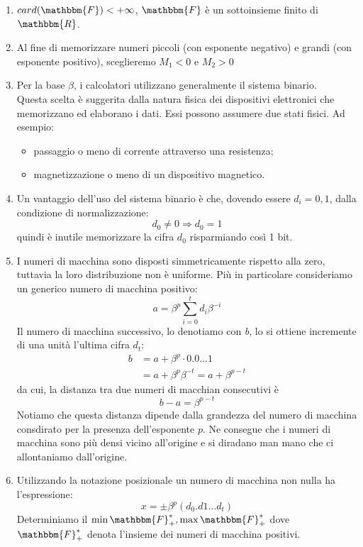 \documentclass[12pt]{report}
\begin{document}
	\begin{enumerate}
		\item $card(\mathbbm{F}) < +\infty$, $\mathbbm{F}$ è un sottoinsieme finito di $\mathbbm{R}$.
		\item Al fine di memorizzare numeri piccoli (con esponente negativo) e grandi (con esponente positivo), sceglieremo $M_1 < 0$ e $M_2 > 0$
		\item Per la base $\beta$, i calcolatori utilizzano generalmente il sistema binario. \\
		Questa scelta è suggerita dalla natura fisica dei dispositivi elettronici che memorizzano ed elaborano i dati. Essi possono assumere due stati fisici. Ad esempio:
		\begin{itemize}
			\item passaggio o meno di corrente attraverso una resistenza;
			\item magnetizzazione o meno di un dispositivo magnetico.
		\end{itemize}
		\item Un vantaggio dell'uso del sistema binario è che, dovendo essere $d_i = 0, 1$, dalla condizione di normalizzazione:
		\[
		d_0 \neq 0 \Rightarrow d_0 = 1
		\]
		quindi è inutile memorizzare la cifra $d_0$ risparmiando così 1 bit.
		\item I numeri di macchina sono disposti simmetricamente rispetto alla zero, tuttavia la loro distribuzione non è uniforme. Più in particolare consideriamo un generico numero di macchina positivo:
		\[
		a = \beta^p\sum_{i=0}^{t}d_i\beta^{-i}
		\]
		Il numero di macchina successivo, lo denotiamo con \textit{b}, lo si ottiene incremente di una unità l'ultima cifra $d_t$:
		\begin{align*}
			b &= a + \beta^p \cdot 0.0\dots1 \\
			&= a + \beta^p\beta^{-t} = a + \beta^{p-t}
		\end{align*}
		da cui, la distanza tra due numeri di macchian consecutivi è
		\[
		b - a = \beta^{p-t}
		\]
		Notiamo che questa distanza dipende dalla grandezza del numero di macchina consdirato per la presenza dell'esponente $p$. Ne consegue che i numeri di macchina sono più densi vicino all'origine e si diradano man mano che ci allontaniamo dall'origine.
		\item Utilizzando la notazione posizionale un numero di macchina non nulla ha l'espressione:
		\[
		x = \pm\beta^p(d_0.d1\dots d_t)
		\]
		Determiniamo il $\min{\mathbbm{F}_+^*}, \max{\mathbbm{F}_+^*}$ dove $\mathbbm{F}_+^*$ denota l'insieme dei numeri di macchina positivi. \\

\end{enumerate}
\end{document}
